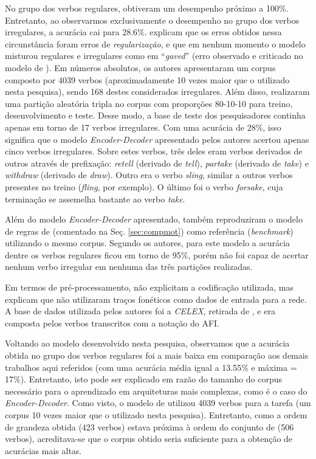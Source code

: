  No grupo dos verbos regulares, \cite{kirov:2018} obtiveram um desempenho próximo a 100\%. Entretanto, ao observarmos exclusivamente o desempenho no grupo dos verbos irregulares, a acurácia cai para 28.6\%. \cite{kirov:2018} explicam que os erros obtidos nessa circunstância foram erros de \textit{regularização}, e que em nenhum momento o modelo misturou regulares e irregulares como em “\textit{gaved}” (erro observado e criticado no modelo de \cite{rumelhart:1986}). Em números absolutos, os autores apresentaram um corpus composto por 4039 verbos (aproximadamente 10 vezes maior que o utilizado nesta pesquisa), sendo 168 destes considerados irregulares. Além disso, \cite{kirov:2018} realizaram uma partição aleatória tripla no corpus com proporções 80-10-10 para treino, desenvolvimento e teste. Desse modo, a base de teste dos pesquisadores continha apenas em torno de 17 verbos irregulares. Com uma acurácia de 28\%, isso significa que o modelo \textit{Encoder-Decoder} apresentado pelos autores acertou apenas cinco verbos irregulares. Sobre estes verbos, três deles eram verbos derivados de outros através de prefixação: \textit{retell} (derivado de \textit{tell}), \textit{partake} (derivado de \textit{take}) e \textit{withdraw} (derivado de \textit{draw}). Outro era o verbo \textit{sling}, similar a outros verbos presentes no treino (\textit{fling}, por exemplo). O último foi o verbo \textit{forsake}, cuja terminação se assemelha bastante ao verbo \textit{take}.

Além do modelo \textit{Encoder-Decoder} apresentado, \cite{kirov:2018} também reproduziram o modelo de regras de \cite{Albright2003RulesVA} (comentado na Seç. \ref{sec:compmot}) como referência (\textit{benchmark}) utilizando o mesmo corpus. Segundo os autores, para este modelo a acurácia dentre os verbos regulares ficou em torno de 95\%, porém não foi capaz de acertar nenhum verbo irregular em nenhuma das três partições realizadas. 

Em termos de pré-processamento, \cite{kirov:2018}
não explicitam a codificação utilizada, mas explicam que não utilizaram traços fonéticos como dados de entrada para a rede. A base de dados utilizada pelos autores foi a \textit{CELEX}, retirada de \cite{Baayen1993TheCL}, e era composta pelos verbos transcritos com a notação do AFI. 

Voltando ao modelo desenvolvido nesta pesquisa, observamos que a acurácia obtida no grupo dos verbos regulares foi a mais baixa em comparação aos demais trabalhos aqui referidos (com uma acurácia média igual a 13.55\% e máxima = 17\%). Entretanto, isto pode ser explicado em razão do tamanho do corpus necessário para o aprendizado em arquiteturas mais complexas, como é o caso do \textit{Encoder-Decoder}. Como visto, o modelo de \cite{kirov:2018} utilizou 4039 verbos para a tarefa (um corpus 10 vezes maior que o utilizado nesta pesquisa). Entretanto, como a ordem de grandeza obtida (423 verbos) estava próxima à ordem do conjunto de \cite{rumelhart:1986} (506 verbos), acreditava-se que o corpus obtido seria suficiente para a obtenção de acurácias mais altas. 

